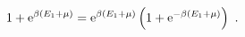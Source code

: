 \begin{equation}
1+ {\rm e}^{\beta(E_1+\mu)} = {\rm e}^{\beta (E_1+\mu)} \left( 1+{\rm e}^{-\beta (E_1+\mu)}\right) \ .
\label{t26}
\end{equation}

